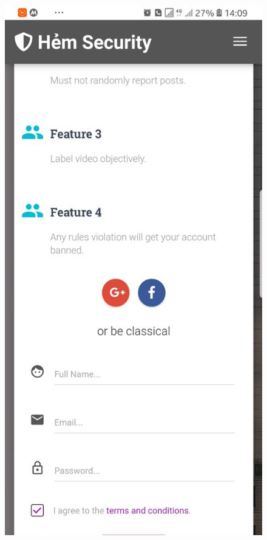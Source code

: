 \begin{figure}[!htb]
  \includegraphics[width=\linewidth]{images/chap4/signup_mb.jpg}
\endminipage\hfill
{}

\end{figure}
